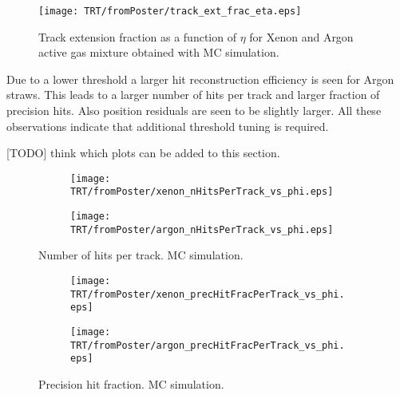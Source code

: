 \begin{figure}
\begin{center}
 \texttt{[image: TRT/fromPoster/track\_ext\_frac\_eta.eps]}
\caption{Track extension fraction as a function of $\eta$ for Xenon and Argon active gas mixture obtained with MC simulation.}
\label{fig:meanFreePath}
\end{center}
\end{figure}



Due to a lower threshold a larger hit reconstruction efficiency is seen for Argon straws. This leads to a
larger number of hits per track and larger fraction of precision hits. Also position residuals are seen to be 
slightly larger. All these observations indicate that additional threshold tuning is required.

[TODO] think which plots can be added to this section.

\begin{figure}

\begin{subfigure}{.5\textwidth}
  \centering
  \texttt{[image: TRT/fromPoster/xenon\_nHitsPerTrack\_vs\_phi.eps]}
\end{subfigure}%
\begin{subfigure}{.5\textwidth}
  \centering
  \texttt{[image: TRT/fromPoster/argon\_nHitsPerTrack\_vs\_phi.eps]}
\end{subfigure}

\caption{Number of hits per track. MC simulation.}
  \label{fig:nPrecHitsPerTrack}
\end{figure}


\begin{figure}

\begin{subfigure}{.5\textwidth}
  \centering
  \texttt{[image: TRT/fromPoster/xenon\_precHitFracPerTrack\_vs\_phi.eps]}
\end{subfigure}%
\begin{subfigure}{.5\textwidth}
  \centering
  \texttt{[image: TRT/fromPoster/argon\_precHitFracPerTrack\_vs\_phi.eps]}
\end{subfigure}

\caption{Precision hit fraction. MC simulation.}
  \label{fig:precHitFracPerTrack}
\end{figure}

